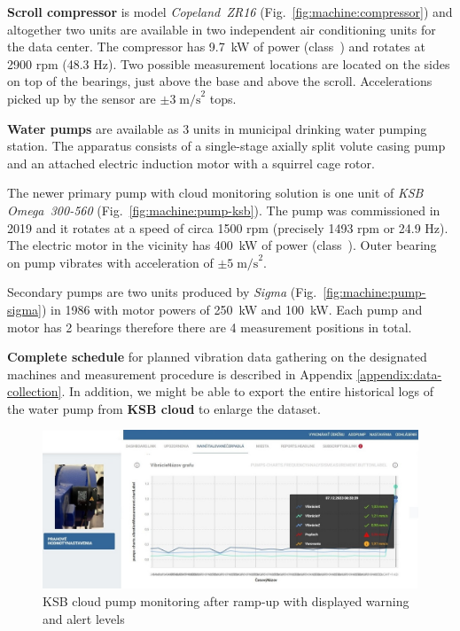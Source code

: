 \textbf{Scroll compressor} is model \emph{Copeland~ZR16} (Fig.~\ref{fig:machine:compressor}) and altogether two units are available in two independent air conditioning units for the data center. The compressor has 9.7~kW of power (class~) and rotates at 2900 rpm (48.3 Hz). Two possible measurement locations are located on the sides on top of the bearings, just above the base and above the scroll. Accelerations picked up by the sensor are $\pm 3\;\mathrm{m/s}^2$ tops.

\textbf{Water pumps} are available as 3 units in municipal drinking water pumping station. The apparatus consists of a single-stage axially split volute casing pump and an attached electric induction motor with a squirrel cage rotor. 

The newer primary pump with cloud monitoring solution is one unit of \emph{KSB Omega~300-560} (Fig.~\ref{fig:machine:pump-ksb}). The pump was commissioned in 2019 and it rotates at a speed of circa 1500 rpm (precisely 1493 rpm or 24.9 Hz). The electric motor in the vicinity has 400~kW of power (class~). Outer bearing on pump vibrates with acceleration of $\pm 5 \;\mathrm{m/s}^2$. 

Secondary pumps are two units produced by \emph{Sigma} (Fig.~\ref{fig:machine:pump-sigma}) in 1986 with motor powers of 250~kW and 100~kW. Each pump and motor has 2 bearings therefore there are 4 measurement positions in total.

\textbf{Complete schedule} for planned vibration data gathering on the designated machines and measurement procedure is described in Appendix \ref{appendix:data-collection}. In addition, we might be able to export the entire historical logs of the water pump from \textbf{KSB cloud} to enlarge the dataset.

\begin{figure}[ht]
    \centering
    \includegraphics[width=\textwidth]{assets/design/ksb-cloud.jpg}
     \caption{KSB cloud pump monitoring after ramp-up with displayed warning and alert levels}
\end{figure}

